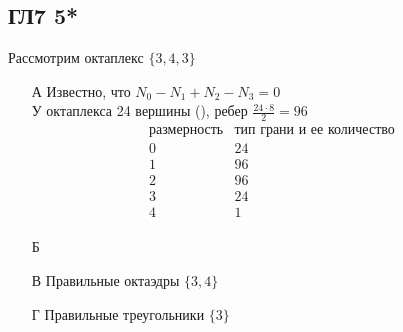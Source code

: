\subsection*{ГЛ7 5*}
Рассмотрим октаплекс $\{3,4,3\}$\\
\begin{enumerate}
\item[А] Известно, что $N_0 - N_1 + N_2 - N_3 = 0$\\
	У октаплекса 24 вершины (), ребер $\frac{24 \cdot 8}{2} = 96$ 
	\begin{gather*}
		\begin{matrix}
			\text{размерность} & \text{тип грани и ее количество}\\
			0 & 24\\
			1 & 96\\
			2 & 96\\
			3 & 24\\
			4 & 1
		\end{matrix}
	\end{gather*}
\item[Б] 
\item[В] Правильные октаэдры $\{3,4\}$
\item[Г] Правильные треугольники $\{3\}$

\end{enumerate}
		